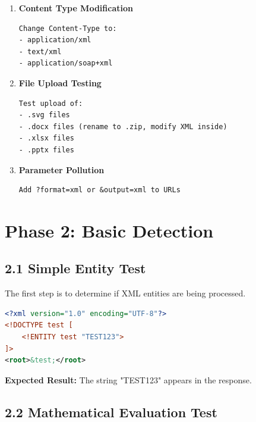 \documentclass{article}
\begin{document}
\begin{methodbox}
\begin{enumerate}
    \item \textbf{Content Type Modification}
    \begin{lstlisting}[basicstyle=\ttfamily\scriptsize]
Change Content-Type to:
- application/xml
- text/xml
- application/soap+xml
    \end{lstlisting}
    
    \item \textbf{File Upload Testing}
    \begin{lstlisting}[basicstyle=\ttfamily\scriptsize]
Test upload of:
- .svg files
- .docx files (rename to .zip, modify XML inside)
- .xlsx files
- .pptx files
    \end{lstlisting}
    
    \item \textbf{Parameter Pollution}
    \begin{lstlisting}[basicstyle=\ttfamily\scriptsize]
Add ?format=xml or &output=xml to URLs
    \end{lstlisting}
\end{enumerate}
\end{methodbox}

\section{Phase 2: Basic Detection}

\subsection{2.1 Simple Entity Test}

The first step is to determine if XML entities are being processed.

\begin{exploitbox}
\begin{lstlisting}[language=XML]
<?xml version="1.0" encoding="UTF-8"?>
<!DOCTYPE test [
    <!ENTITY test "TEST123">
]>
<root>&test;</root>
\end{lstlisting}
\end{exploitbox}

\textbf{Expected Result:} The string "TEST123" appears in the response.

\subsection{2.2 Mathematical Evaluation Test}
\end{document}
